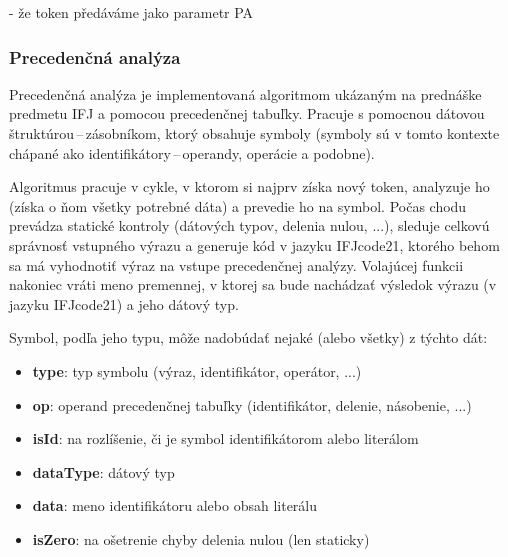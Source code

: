 \documentclass[a4paper, 12pt]{article}
\begin{document}
- že token předáváme jako parametr PA


\subsubsection{Precedenčná analýza}

Precedenčná analýza je implementovaná algoritmom ukázaným na prednáške predmetu IFJ a pomocou precedenčnej tabuľky. Pracuje s pomocnou dátovou štruktúrou\,--\,zásobníkom, ktorý obsahuje symboly (symboly sú v tomto kontexte chápané ako identifikátory\,--\,operandy, operácie a podobne).

Algoritmus pracuje v cykle, v ktorom si najprv získa nový token, analyzuje ho (získa o ňom všetky potrebné dáta) a prevedie ho na symbol. Počas chodu prevádza statické kontroly (dátových typov, delenia nulou, ...), sleduje celkovú správnosť vstupného výrazu a generuje kód v jazyku IFJcode21, ktorého behom sa má vyhodnotiť výraz na vstupe precedenčnej analýzy. Volajúcej funkcii nakoniec vráti meno premennej, v ktorej sa bude nachádzať výsledok výrazu (v jazyku IFJcode21) a jeho dátový typ.

Symbol, podľa jeho typu, môže nadobúdať nejaké (alebo všetky) z týchto dát:
\begin{itemize}
    \item \textbf{type}: typ symbolu (výraz, identifikátor, operátor, ...)
    \item \textbf{op}: operand precedenčnej tabuľky (identifikátor, delenie, násobenie, ...)
    \item \textbf{isId}: na rozlíšenie, či je symbol identifikátorom alebo literálom
    \item \textbf{dataType}: dátový typ
    \item \textbf{data}: meno identifikátoru alebo obsah literálu
    \item \textbf{isZero}: na ošetrenie chyby delenia nulou (len staticky)
\end{itemize}
\end{document}
